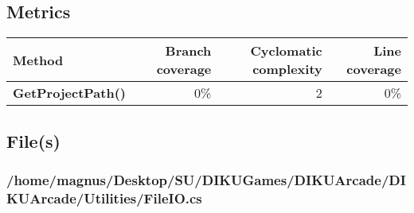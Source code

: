\documentclass[a4paper,landscape,10pt]{article}
\begin{document}
\subsection{Metrics}
\begin{longtable}[l]{|l|r|r|r|}
\hline
\textbf{Method} & \textbf{Branch coverage} & \textbf{Cyclomatic complexity} & \textbf{Line coverage}\\
\hline
\textbf{GetProjectPath()} & 0\% & 2 & 0\%\\
\hline
\end{longtable}
\subsection{File(s)}
\subsubsection{/home/magnus/Desktop/SU/DIKUGames/DIKUArcade/DIKUArcade/Utilities/FileIO.cs}
\end{document}
